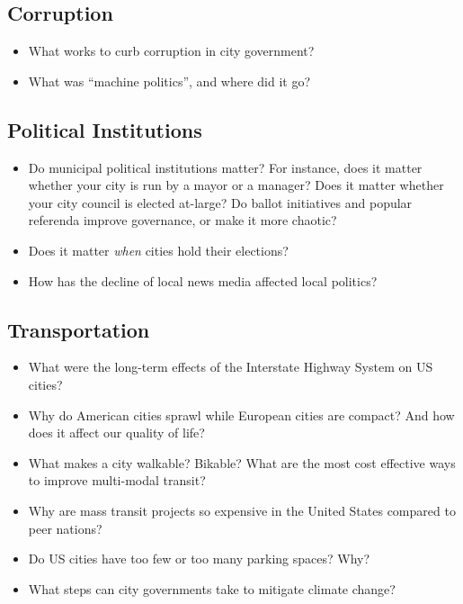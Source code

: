 \documentclass[11pt, letterpaper]{article}
\begin{document}
\subsection*{Corruption}

\begin{itemize}
	\item What works to curb corruption in city government?
	\item What was ``machine politics'', and where did it go?
\end{itemize}

\subsection*{Political Institutions}

\begin{itemize}
	\item Do municipal political institutions matter? For instance, does it matter whether your city is run by a mayor or a manager? Does it matter whether your city council is elected at-large? Do ballot initiatives and popular referenda improve governance, or make it more chaotic?
	\item Does it matter \textit{when} cities hold their elections?
	\item How has the decline of local news media affected local politics?
\end{itemize}



\subsection*{Transportation}

\begin{itemize}
	\item What were the long-term effects of the Interstate Highway System on US cities?
	\item Why do American cities sprawl while European cities are compact? And how does it affect our quality of life?
	\item What makes a city walkable? Bikable? What are the most cost effective ways to improve multi-modal transit? %
	\item Why are mass transit projects so expensive in the United States compared to peer nations?
	\item Do US cities have too few or too many parking spaces? Why?
	\item What steps can city governments take to mitigate climate change? %
\end{itemize}
\end{document}
